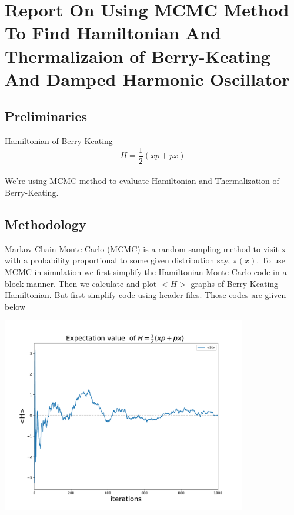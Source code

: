 \documentclass[12pt, letterpaper]{article}
\title{}
\begin{document}
    \section*{Report On Using MCMC Method To Find Hamiltonian And Thermalizaion of Berry-Keating And Damped Harmonic Oscillator}
    \subsection*{Preliminaries}
        Hamiltonian of Berry-Keating  
        \begin{equation}
            H = \frac{1}{2}(xp + px)
        \end{equation}
        \\
        
    

        We're using MCMC method to evaluate Hamiltonian and Thermalization of Berry-Keating. 
    
    \subsection*{Methodology}
        Markov Chain Monte Carlo (MCMC) is a random sampling method to visit x with a probability proportional to some given
        distribution say, $\pi (x)$. To use MCMC in simulation we first simplify the Hamiltonian Monte Carlo code in a block
        manner. Then we calculate and plot $<H>$ graphs of Berry-Keating Hamiltonian. 
        But first simplify code using header files. Those codes are giiven below

        \begin{adjustbox}{center,caption={Graph of Expectation value of Berry-Keating},nofloat=figure,label={somelabel}}
            \includegraphics[width=0.8\textwidth]{bk.pdf}
        \end{adjustbox}
\end{document}
